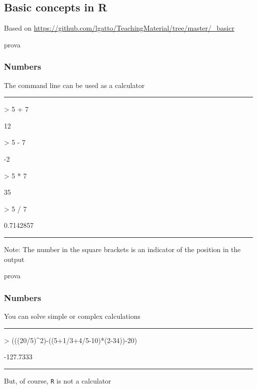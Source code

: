 \documentclass{beamer}
\begin{document}
\begin{frame}
\section{Basic concepts in R}
\vspace{30pt}
\scriptsize
\begin{flushright}  Based on \url{https://github.com/lgatto/TeachingMaterial/tree/master/\_basicr} \end{flushright}
\end{frame}
\begin{frame}[fragile]{prova}
	\frametitle{Numbers}
	The command line can be used as a calculator
\rule{\textwidth}{0.4pt}
\begin{Schunk}
\begin{Sinput}
> 5 + 7 
\end{Sinput}
\begin{Soutput}
[1] 12
\end{Soutput}
\begin{Sinput}
> 5 - 7
\end{Sinput}
\begin{Soutput}
[1] -2
\end{Soutput}
\begin{Sinput}
> 5 * 7
\end{Sinput}
\begin{Soutput}
[1] 35
\end{Soutput}
\begin{Sinput}
> 5 / 7
\end{Sinput}
\begin{Soutput}
[1] 0.7142857
\end{Soutput}
\end{Schunk}
\rule{\textwidth}{0.4pt}
\vspace{5pt}
\small Note: The number in the square brackets is an indicator of the position in the output
\end{frame}

\begin{frame}[fragile]{prova}
	\frametitle{Numbers}
	You can solve simple or complex calculations 
	\rule{\textwidth}{0.4pt}
\begin{Schunk}
\begin{Sinput}
> (((20/5)^2)-((5+1/3+4/5-10)*(2-34))-20)
\end{Sinput}
\begin{Soutput}
[1] -127.7333
\end{Soutput}
\end{Schunk}
\rule{\textwidth}{0.4pt}
\vspace{20pt}
\Large But, of course, \texttt{R} is not a calculator
\end{frame}
\end{document}
